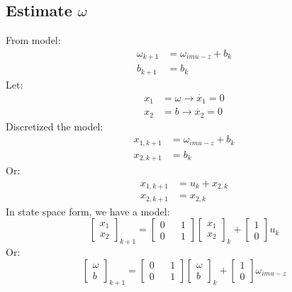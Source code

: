 	\subsection{Estimate \(\omega\)}
	From model:
	\begin{equation}
		\begin{split}
			\omega_{k+1} &= \omega_{imu-z} + b_k \\
			b_{k+1} &= b_k
		\end{split}
		\label{sensorfuseq12}
	\end{equation}
	Let:
	\[\begin{split}
		x_1 &= \omega \rightarrow \dot{x_1} = 0 \\
		x_2 &= b \rightarrow \dot{x_2} = 0
	\end{split}\]
	Discretized the model:
	\[\begin{split}
		x_{1,k+1} &= \omega_{imu-z} + b_k \\
		x_{2,k+1} &= b_k
	\end{split}\]
	Or:
	\[\begin{split}
		x_{1,k+1} &= u_k + x_{2,k} \\
		x_{2,k+1} &= x_{2,k}
	\end{split}\]
	In state space form, we have a model:
	\begin{equation}
		\boxed{
			\begin{bmatrix}
				x_1 \\
				x_2 
			\end{bmatrix}_{k+1} = 
			\begin{bmatrix}
				0 &   & 1 \\
				0 &   & 1 
			\end{bmatrix}
			\begin{bmatrix}
				x_1 \\
				x_2 
			\end{bmatrix}_k +
			\begin{bmatrix}
				1 \\
				0 
			\end{bmatrix} u_k
		}
		\label{sensorfuseq13}
	\end{equation}
	Or:
	\begin{equation}
		\boxed{
			\begin{bmatrix}
				\omega \\
				b      
			\end{bmatrix}_{k+1} = 
			\begin{bmatrix}
				0 &   & 1 \\
				0 &   & 1 
			\end{bmatrix}
			\begin{bmatrix}
				\omega \\
				b      
			\end{bmatrix}_k +
			\begin{bmatrix}
				1 \\
				0 
			\end{bmatrix} \omega_{imu-z}
		}
		\label{sensorfuseq14}
	\end{equation}
